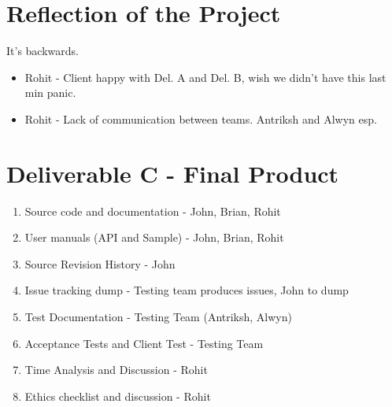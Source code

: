 
\date{19 September, 2011}


\maketitle{}


\section{Reflection of the Project}
It's backwards.
\begin{itemize}
\item Rohit - Client happy with Del. A and Del. B, wish we didn't have this last min panic.
\item Rohit - Lack of communication between teams. Antriksh and Alwyn esp.
\end{itemize}

\section{Deliverable C - Final Product}
\begin{enumerate}
\item Source code and documentation - John, Brian, Rohit
\item User manuals (API and Sample) - John, Brian, Rohit
\item Source Revision History - John
\item Issue tracking dump - Testing team produces issues, John to dump
\item Test Documentation - Testing Team (Antriksh, Alwyn)
\item Acceptance Tests and Client Test - Testing Team
\item Time Analysis and Discussion - Rohit
\item Ethics checklist and discussion - Rohit
\end{enumerate}




